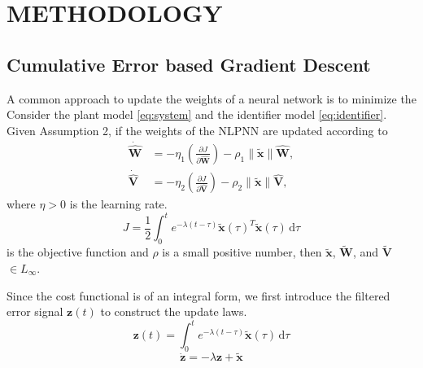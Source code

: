 \documentclass[10pt,twocolumn]{ICCAS}
\newcommand{\ud}{\,\mathrm{d}}
\newcommand{\xtilde}{\tilde{\bm{x}}}
\newcommand{\What}{\hat{\mathbf{W}}}
\newcommand{\Vhat}{\hat{\mathbf{V}}}
\begin{document}
\section{METHODOLOGY}

\subsection{Cumulative Error based Gradient Descent}
A common approach to update the weights of a neural network is to minimize the 
Consider the plant model \eqref{eq:system} and the identifier model \eqref{eq:identifier}. Given Assumption 2, if the weights of the NLPNN are updated according to
\begin{align}
    \dot{\mathbf{\What}} &= -\eta_1\left(\frac{\partial J}{\partial \hat{\mathbf{W}}}\right) - \rho_1\|\tilde{\bm{x}}\|\hat{\mathbf{W}},\\
    \dot{\mathbf{\Vhat}} &= -\eta_2\left(\frac{\partial J}{\partial \hat{\mathbf{V}}}\right) - \rho_2\|\tilde{\bm{x}}\|\hat{\mathbf{V}},
\end{align}
where $\eta > 0$ is the learning rate. 
\begin{equation}
J = \frac{1}{2} \int_{0}^{t} e^{-\lambda(t-\tau)} {\xtilde(\tau)}^T \xtilde(\tau) \ud\tau 
\end{equation} 
is the objective function and $\rho$ is a small positive number, then $\tilde{\bm{x}}$, $\tilde{\mathbf{W}}$, and $\tilde{\mathbf{V}}$ $\in L_\infty.$

Since the cost functional is of an integral form, we first introduce the filtered error signal $\bm{z}(t)$ to construct the update laws.
\begin{equation}
    \bm{z}(t) = \int_{0}^{t} e^{-\lambda(t-\tau)} \xtilde(\tau) \ud\tau
    \label{eq:filter_z}
\end{equation}
\begin{equation}
    \dot{\bm{z}} = - \lambda\bm{z} + \xtilde
    \label{eq:filter_z_dot}
\end{equation}
\end{document}
